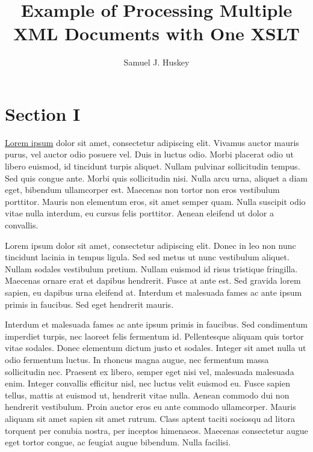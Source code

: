\documentclass{book}
\title{Example of Processing Multiple XML Documents with One XSLT}
\author{Samuel J. Huskey}
\begin{document}
        
      
         
            
\section{Section I}\label{section1}

            \hyperref[section2]{Lorem ipsum} dolor sit amet, consectetur adipiscing elit.
               Vivamus auctor mauris purus, vel auctor odio posuere vel. Duis in luctus odio. Morbi
               placerat odio ut libero euismod, id tincidunt turpis aliquet. Nullam pulvinar
               sollicitudin tempus. Sed quis congue ante. Morbi quis sollicitudin nisi. Nulla arcu
               urna, aliquet a diam eget, bibendum ullamcorper est. Maecenas non tortor non eros
               vestibulum porttitor. Mauris non elementum eros, sit amet semper quam. Nulla suscipit
               odio vitae nulla interdum, eu cursus felis porttitor. Aenean eleifend ut dolor a
               convallis. 


            Lorem ipsum dolor sit amet, consectetur adipiscing elit. Donec in leo non nunc
               tincidunt lacinia in tempus ligula. Sed sed metus ut nunc vestibulum aliquet. Nullam
               sodales vestibulum pretium. Nullam euismod id risus tristique fringilla. Maecenas
               ornare erat et dapibus hendrerit. Fusce at ante est. Sed gravida lorem sapien, eu
               dapibus urna eleifend at. Interdum et malesuada fames ac ante ipsum primis in
               faucibus. Sed eget hendrerit mauris.

            Interdum et malesuada fames ac ante ipsum primis in faucibus. Sed condimentum
               imperdiet turpis, nec laoreet felis fermentum id. Pellentesque aliquam quis tortor
               vitae sodales. Donec elementum dictum justo et sodales. Integer sit amet nulla ut
               odio fermentum luctus. In rhoncus magna augue, nec fermentum massa sollicitudin nec.
               Praesent ex libero, semper eget nisi vel, malesuada malesuada enim. Integer convallis
               efficitur nisl, nec luctus velit euismod eu. Fusce sapien tellus, mattis at euismod
               ut, hendrerit vitae nulla. Aenean commodo dui non hendrerit vestibulum. Proin auctor
               eros eu ante commodo ullamcorper. Mauris aliquam sit amet sapien sit amet rutrum.
               Class aptent taciti sociosqu ad litora torquent per conubia nostra, per inceptos
               himenaeos. Maecenas consectetur augue eget tortor congue, ac feugiat augue bibendum.
               Nulla facilisi.
\end{document}

